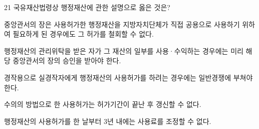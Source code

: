 \begin{question}{21}
국유재산법령상 행정재산에 관한 설명으로 옳은 것은?
\begin{choices}
  \item 중앙관서의 장은 사용허가한 행정재산을 지방자치단체가 직접 공용으로 사용하기 위하여 필요하게 된 경우에도 그 허가를 철회할 수 없다.
  \item 행정재산의 관리위탁을 받은 자가 그 재산의 일부를 사용·수익하는 경우에는 미리 해당 중앙관서의 장의 승인을 받아야 한다.
  \item 경작용으로 실경작자에게 행정재산의 사용허가를 하려는 경우에는 일반경쟁에 부쳐야 한다.
  \item 수의의 방법으로 한 사용허가는 허가기간이 끝난 후 갱신할 수 없다.
  \item 행정재산의 사용허가를 한 날부터 3년 내에는 사용료를 조정할 수 없다.
\end{choices}
\end{question}
